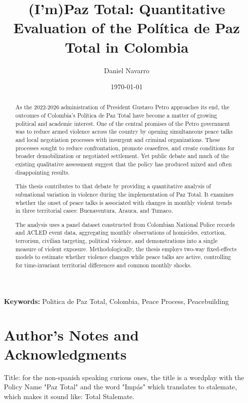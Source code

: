 \documentclass[11pt]{article}
\title{(I'm)Paz Total: Quantitative Evaluation of the Política de Paz Total in Colombia}
\author{Daniel Navarro}
\date{\today}
\begin{document}
\doublespacing  
\maketitle
\begin{abstract}
As the 2022-2026 administration of President Gustavo Petro approaches its end, the outcomes of Colombia's Política de Paz Total have become a matter of growing political and academic interest. One of the central promises of the Petro government was to reduce armed violence across the country by opening simultaneous peace talks and local negotiation processes with insurgent and criminal organizations. These processes sought to reduce confrontation, promote ceasefires, and create conditions for broader demobilization or negotiated settlement. Yet public debate and much of the existing qualitative assessment suggest that the policy has produced mixed and often disappointing results.

This thesis contributes to that debate by providing a quantitative analysis of subnational variation in violence during the implementation of Paz Total. It examines whether the onset of peace talks is associated with changes in monthly violent trends in three territorial cases: Buenaventura, Arauca, and Tumaco.

The analysis uses a panel dataset constructed from Colombian National Police records and ACLED event data, aggregating monthly observations of homicides, extortion, terrorism, civilian targeting, political violence, and demonstrations into a single measure of violent exposure. Methodologically, the thesis employs two-way fixed-effects models to estimate whether violence changes while peace talks are active, controlling for time-invariant territorial differences and common monthly shocks. 
\end{abstract}

\textbf{Keywords:} Politica de Paz Total, Colombia, Peace Process, Peacebuilding


\newpage
\tableofcontents 

\newpage

\section{Author's Notes and Acknowledgments}\label{Autor's Notes and Acknowledgments}

Title: for the non-spanish speaking curious ones, the title is a wordplay with the Policy Name "Paz Total" and the word "Impás" which translates to stalemate, which makes it sound like: Total Stalemate. 
\end{document}

